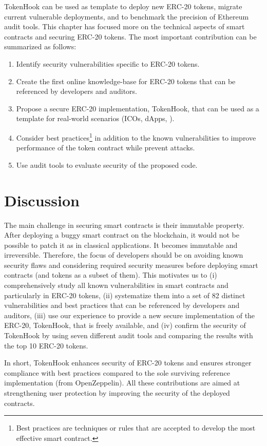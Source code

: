 TokenHook can be used as template to deploy new ERC-20 tokens, migrate current vulnerable deployments, and to benchmark the precision of Ethereum audit tools. This chapter has focused more on the technical aspects of smart contracts and securing ERC-20 tokens. The most important contribution can be summarized as follows:
\begin{enumerate}
	\item Identify security vulnerabilities specific to ERC-20 tokens.
	
	\item Create the first online knowledge-base for ERC-20 tokens that can be referenced by developers and auditors.
	
	\item Propose a secure ERC-20 implementation, TokenHook, that can be used as a template for real-world scenarios (\ie ICOs, dApps, \etc).
	
	\item Consider best practices\footnote{Best practices are techniques or rules that are accepted to develop the most effective smart contract.} in addition to the known vulnerabilities to improve performance of the token contract while prevent attacks.
	
	\item Use audit tools to evaluate security of the proposed code.
\end{enumerate}

\section{Discussion}
The main challenge in securing smart contracts is their immutable property. After deploying a buggy smart contract on the blockchain, it would not be possible to patch it as in classical applications. It becomes immutable and irreversible. Therefore, the focus of developers should be on avoiding known security flaws and considering required security measures before deploying smart contracts (and tokens as a subset of them). This motivates us to (i) comprehensively study all known vulnerabilities in smart contracts and particularly in ERC-20 tokens, (ii) systematize them into a set of 82 distinct vulnerabilities and best practices that can be referenced by developers and auditors, (iii) use our experience to provide a new secure implementation of the ERC-20, TokenHook, that is freely available, and (iv) confirm the security of TokenHook by using seven different audit tools and comparing the results with the top 10 ERC-20 tokens. 

In short, TokenHook enhances security of ERC-20 tokens and ensures stronger compliance with best practices compared to the sole surviving reference implementation (from OpenZeppelin). All these contributions are aimed at strengthening user protection by improving the security of the deployed contracts.